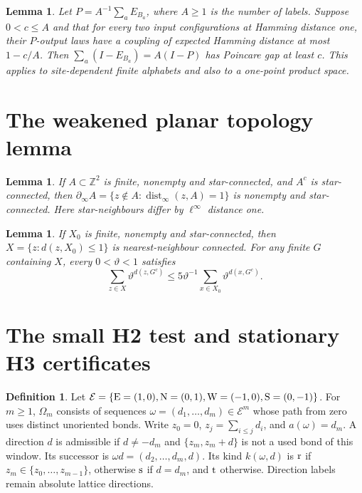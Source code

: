 \documentclass[11pt,reqno]{amsart}
\newtheorem{lemma}[theorem]{Lemma}
\theoremstyle{definition}
\newtheorem{definition}[theorem]{Definition}
\theoremstyle{remark}
\begin{document}
\begin{lemma}\label{l:contraction}
Let \(P=A^{-1}\sum_aE_{B_a}\), where \(A\ge1\) is the number
of labels. Suppose \(0<c\le A\) and that for every two input
configurations at Hamming distance one, their \(P\)-output laws
have a coupling of expected Hamming distance at most \(1-c/A\).
Then \(\sum_a(I-E_{B_a})=A(I-P)\) has Poincare gap at least \(c\).
This applies to site-dependent finite alphabets and also to a
one-point product space.
\end{lemma}


\section{The weakened planar topology lemma}

\begin{lemma}\label{l:boundaryconn}
If \(A\subset\mathbb Z^2\) is finite, nonempty and star-connected,
and \(A^c\) is star-connected, then
\(\partial_\infty A=\{z\notin A:\operatorname{dist}_\infty(z,A)=1\}\)
is nonempty and star-connected.
Here star-neighbours differ by \(\ell^\infty\) distance one.
\end{lemma}

\begin{lemma}\label{l:thicken}
If \(X_0\) is finite, nonempty and star-connected, then
\(X=\{z:d(z,X_0)\le1\}\) is nearest-neighbour connected.
For any finite \(G\) containing \(X\), every \(0<\vartheta<1\)
satisfies
\[
 \sum_{z\in X}\vartheta^{d(z,G^c)}
       \le5\vartheta^{-1}
                      \sum_{x\in X_0}\vartheta^{d(x,G^c)}.
\]
\end{lemma}


\section{The small H2 test and stationary H3 certificates}

\begin{definition}\label{d:memory-automaton}
Let \(\mathcal E=\{{\rm E}=(1,0),{\rm N}=(0,1),
{\rm W}=(-1,0),{\rm S}=(0,-1)\}\).
For \(m\ge1\), \(\Omega_m\) consists of sequences
\(\omega=(d_1,\ldots,d_m)\in\mathcal E^m\) whose path from zero
uses distinct unoriented bonds. Write \(z_0=0\),
\(z_j=\sum_{i\le j}d_i\), and \(a(\omega)=d_m\).
A direction \(d\) is admissible if \(d\ne-d_m\) and
\(\{z_m,z_m+d\}\) is not a used bond of this window.
Its successor is \(\omega d=(d_2,\ldots,d_m,d)\).
Its kind \(k(\omega,d)\) is \({\rm r}\) if
\(z_m\in\{z_0,\ldots,z_{m-1}\}\), otherwise \({\rm s}\)
if \(d=d_m\), and \({\rm t}\) otherwise.
Direction labels remain absolute lattice directions.
\end{definition}
\end{document}
